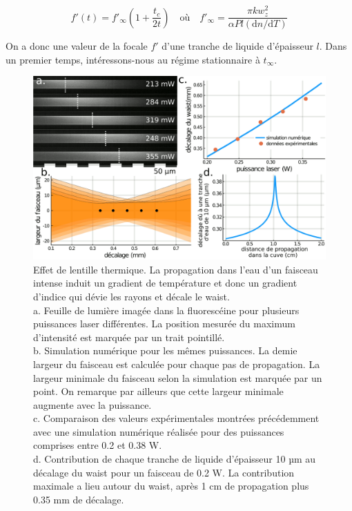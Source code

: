 $$
f'(t) = f'_\infty \left( 1 + \frac{t_c}{2t} \right) \quad
\text{où} \quad f'_\infty = \frac{\pi k w_z^2}{\alpha Pl(\mathrm{d}n/\mathrm{d}T)}
$$

On a donc une valeur de la focale $f'$ d'une tranche de liquide d'épaisseur $l$. Dans un premier temps, intéressons-nous au régime stationnaire à $t_\infty$.

\begin{figure}
    \centering
    \includegraphics[width=\textwidth]{./files/thermal_shift_model.svg.png}
    \caption{Effet de lentille thermique. La propagation dans l'eau d'un faisceau intense induit un gradient de température et donc un gradient d'indice qui dévie les rayons et décale le waist.
    \\ a. Feuille de lumière imagée dans la fluorescéine pour plusieurs puissances laser différentes. La position mesurée du maximum d'intensité est marquée par un trait pointillé.
    \\ b. Simulation numérique pour les mêmes puissances. La demie largeur du faisceau est calculée pour chaque pas de propagation. La largeur minimale du faisceau selon la simulation est marquée par un point. On remarque par ailleurs que cette largeur minimale augmente avec la puissance.
    \\ c. Comparaison des valeurs expérimentales montrées précédemment avec une simulation numérique réalisée pour des puissances comprises entre 0.2 et 0.38 W.
    \\ d. Contribution de chaque tranche de liquide d'épaisseur 10 µm au décalage du waist pour un faisceau de 0.2 W. La contribution maximale a lieu autour du waist, après 1 cm de propagation plus 0.35 mm de décalage.
    \label{FIGthermalfluorescine}}
    \end{figure}

